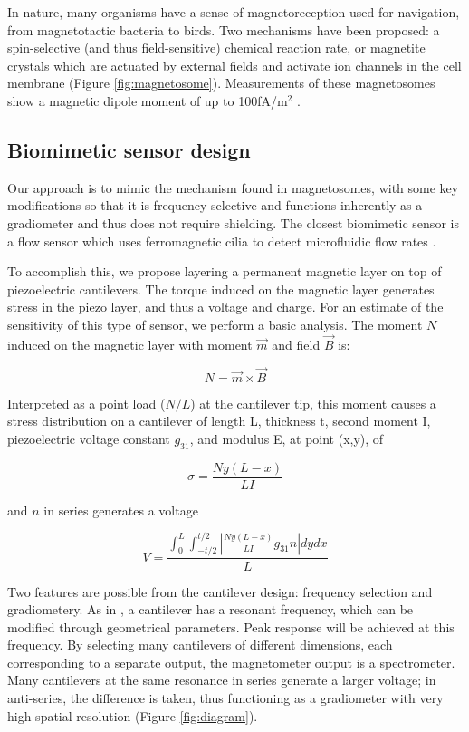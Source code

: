 In nature, many organisms have a sense of magnetoreception used for navigation, from magnetotactic bacteria to birds. Two mechanisms have been proposed: a spin-selective (and thus field-sensitive) chemical reaction rate, or magnetite crystals which are actuated by external fields and activate ion channels in the cell membrane (Figure \ref{fig:magnetosome})\cite{johnsen2005physics,dodson2013radical,kirschvink2001magnetite}. Measurements of these magnetosomes show a magnetic dipole moment of up to 100fA/m$^2$ \cite{hanzlik2002pulsed,eder2012magnetic}.

\subsection{Biomimetic sensor design}

Our approach is to mimic the mechanism found in magnetosomes, with some key modifications so that it is frequency-selective and functions inherently as a gradiometer and thus does not require shielding. The closest biomimetic sensor is a flow sensor which uses ferromagnetic cilia to detect microfluidic flow rates \cite{alfadhel2014magnetic}.

To accomplish this, we propose layering a permanent magnetic layer on top of piezoelectric cantilevers. The torque induced on the magnetic layer generates stress in the piezo layer, and thus a voltage and charge. For an estimate of the sensitivity of this type of sensor, we perform a basic analysis. The moment $N$ induced on the magnetic layer with moment $\vec{m}$ and field $\vec{B}$ is:

$$  N=\vec{m} \times \vec{B} $$

Interpreted as a point load ($N/L$) at the cantilever tip, this moment causes a stress distribution on a cantilever of length L, thickness t, second moment I, piezoelectric voltage constant $g_{31}$, and modulus E, at point (x,y), of

$$ \sigma=\frac{Ny(L-x)}{LI} $$

and $n$ in series generates a voltage

$$ V=\frac{\int_0^L\int_{-t/2}^{t/2}\left|\frac{Ny(L-x)}{LI}g_{31}n\right|dydx}{L} $$


Two features are possible from the cantilever design: frequency selection and gradiometery. As in \cite{shen2008design}, a cantilever has a resonant frequency, which can be modified through geometrical parameters. Peak response will be achieved at this frequency. By selecting many cantilevers of different dimensions, each corresponding to a separate output, the magnetometer output is a spectrometer. Many cantilevers at the same resonance in series generate a larger voltage; in anti-series, the difference is taken, thus functioning as a gradiometer with very high spatial resolution (Figure \ref{fig:diagram}).

